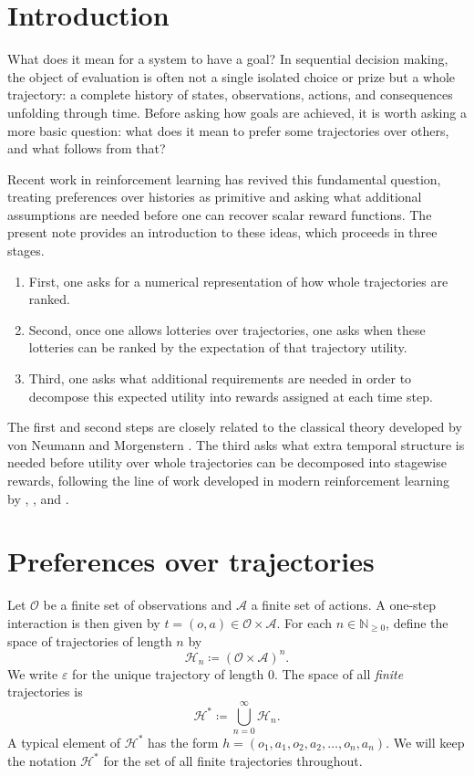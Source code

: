 \documentclass[11pt]{article}
\newcommand{\Hcal}{\mathcal{H}}
\newcommand{\Ofin}{\mathcal{O}}
\newcommand{\Afin}{\mathcal{A}}
\newcommand{\emptytraj}{\varepsilon}
\begin{document}
\section{Introduction}

What does it mean for a system to have a goal? In sequential decision making,
the object of evaluation is often not a single isolated choice or prize but a
whole trajectory: a complete history of states, observations, actions, and
consequences unfolding
through time. Before asking how goals are achieved, it is worth asking a more
basic question: what does it mean to prefer some trajectories over
others, and what follows from that?

Recent work in reinforcement learning has revived this fundamental question,
treating preferences over histories as primitive and asking what additional
assumptions are needed before one can recover scalar reward functions. The
present note provides an introduction to these ideas, which proceeds in three
stages.
\begin{enumerate}[label=(\arabic*)]
    \item First, one asks for a numerical representation of how whole
    trajectories are ranked.
    \item Second, once one allows lotteries over trajectories, one asks when
    these lotteries can be ranked by the expectation of that trajectory
    utility.
    \item Third, one asks what additional requirements are needed in order to
    decompose this expected utility into rewards assigned at each time step.
\end{enumerate}
The first and second steps are closely related to the classical theory developed
by von Neumann and Morgenstern \citep{vonneumann1944theory}. The third asks
what extra temporal structure is needed before utility over whole trajectories
can be decomposed into stagewise rewards, following the line of work developed
in modern reinforcement learning by \citet{pitis2019rethinking},
\citet{shakerinava2022utility}, and \citet{bowling2023settling}.

\section{Preferences over trajectories}

Let $\Ofin$ be a finite set of
observations and $\Afin$ a finite set of actions. A one-step interaction is
then given by $t=(o,a)\in \Ofin\times \Afin$. 
For each $n\in\mathbb{N}_{\geq 0}$, define the space of trajectories of length
$n$ by
\[
\Hcal_n \coloneqq (\Ofin\times \Afin)^n.
\]
We write $\emptytraj$ for the unique trajectory of length $0$. The space of all
\emph{finite} trajectories is
\[
\Hcal^* \coloneqq \bigcup_{n=0}^\infty \Hcal_n.
\]
A typical element of $\Hcal^*$ has the form $h=(o_1,a_1,o_2,a_2,\dots,o_n,a_n)$.
We will keep the notation $\Hcal^*$ for the set of all finite trajectories
throughout.
\end{document}
